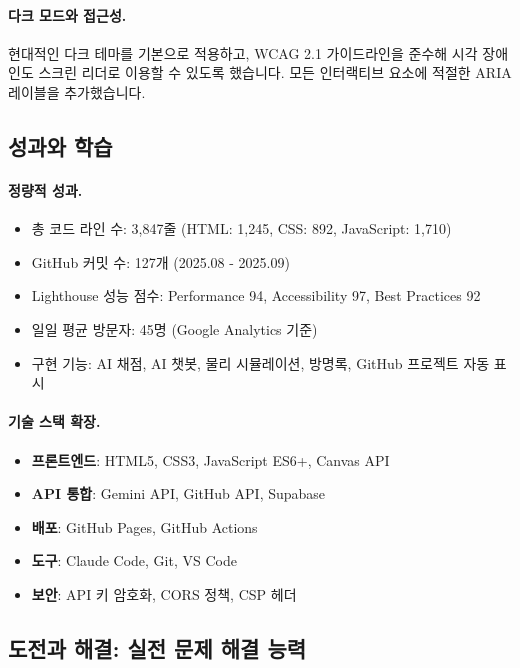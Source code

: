\paragraph{다크 모드와 접근성.}
현대적인 다크 테마를 기본으로 적용하고, WCAG 2.1 가이드라인을 준수해 시각 장애인도 스크린 리더로 이용할 수 있도록 했습니다. 모든 인터랙티브 요소에 적절한 ARIA 레이블을 추가했습니다.

\subsection{성과와 학습}

\paragraph{정량적 성과.}
\begin{itemize}[leftmargin=*]
    \item 총 코드 라인 수: 3,847줄 (HTML: 1,245, CSS: 892, JavaScript: 1,710)
    \item GitHub 커밋 수: 127개 (2025.08 - 2025.09)
    \item Lighthouse 성능 점수: Performance 94, Accessibility 97, Best Practices 92
    \item 일일 평균 방문자: 45명 (Google Analytics 기준)
    \item 구현 기능: AI 채점, AI 챗봇, 물리 시뮬레이션, 방명록, GitHub 프로젝트 자동 표시
\end{itemize}

\paragraph{기술 스택 확장.}
\begin{itemize}[leftmargin=*]
    \item \textbf{프론트엔드}: HTML5, CSS3, JavaScript ES6+, Canvas API
    \item \textbf{API 통합}: Gemini API, GitHub API, Supabase
    \item \textbf{배포}: GitHub Pages, GitHub Actions
    \item \textbf{도구}: Claude Code, Git, VS Code
    \item \textbf{보안}: API 키 암호화, CORS 정책, CSP 헤더
\end{itemize}

\subsection{도전과 해결: 실전 문제 해결 능력}

